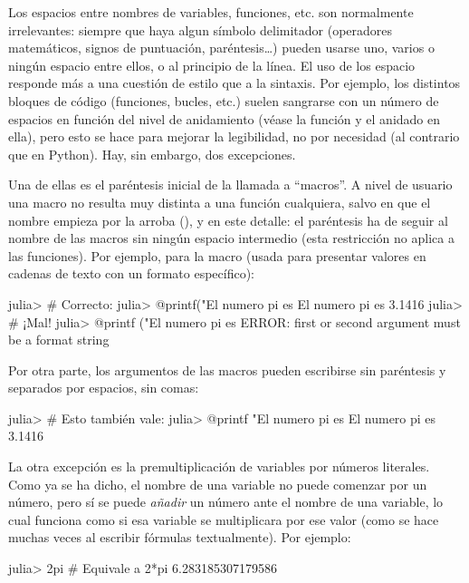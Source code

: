 Los espacios entre nombres de variables, funciones, etc. son normalmente irrelevantes: siempre que haya algun símbolo delimitador (operadores matemáticos, signos de puntuación, paréntesis\ldots) pueden usarse uno, varios o ningún espacio entre ellos, o al principio de la línea. El uso de los espacio responde más a una cuestión de estilo que a la sintaxis. Por ejemplo, los distintos bloques de código (funciones, bucles, etc.) suelen sangrarse con un número de espacios en función del nivel de anidamiento (véase la función  y el  anidado en ella), pero esto se hace para mejorar la legibilidad, no por necesidad (al contrario que en Python). Hay, sin embargo, dos excepciones.

Una de ellas es el paréntesis inicial de la llamada a ``macros''. A nivel de usuario una macro no resulta muy distinta a una función cualquiera, salvo en que el nombre empieza por la arroba (), y en este detalle: el paréntesis ha de seguir al nombre de las macros sin ningún espacio intermedio (esta restricción no aplica a las funciones). Por ejemplo, para la macro  (usada para presentar valores en cadenas de texto con un formato específico):

\begin{jlconcode}
julia> # Correcto:
julia> @printf("El numero pi es %
El numero pi es 3.1416
julia> # ¡Mal!
julia> @printf ("El numero pi es %
ERROR: first or second argument must be a format string
\end{jlconcode}

Por otra parte, los argumentos de las macros pueden escribirse sin
paréntesis y separados por espacios, sin comas:

\begin{jlconcode}
julia> # Esto también vale:
julia> @printf "El numero pi es %
El numero pi es 3.1416
\end{jlconcode}

La otra excepción es la premultiplicación de variables por números literales. Como ya se ha dicho, el nombre de una variable no puede comenzar por un número, pero sí se puede \emph{añadir} un número ante el nombre de una variable, lo cual funciona como si esa variable se multiplicara por ese valor (como se hace muchas veces al escribir fórmulas textualmente). Por ejemplo:

\begin{jlconcode}
julia> 2pi # Equivale a 2*pi
6.283185307179586
\end{jlconcode}

